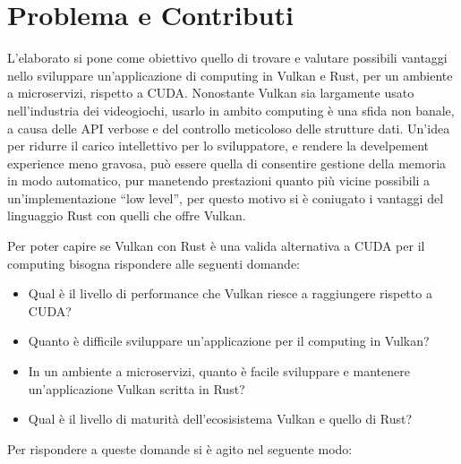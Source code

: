 \section[Problema e Contributi]{Problema e Contributi}


L'elaborato si pone come obiettivo quello di trovare e valutare possibili vantaggi nello sviluppare un'applicazione di computing in Vulkan e Rust, per un ambiente a microservizi, rispetto a CUDA.
Nonostante Vulkan sia largamente usato nell'industria dei videogiochi, usarlo in ambito computing è una sfida non banale, a causa delle API verbose e del controllo meticoloso delle strutture dati. 
Un'idea per ridurre il carico intellettivo per lo sviluppatore, e rendere la develpement experience meno gravosa, può essere quella di consentire gestione della memoria in modo automatico, pur manetendo prestazioni quanto più vicine possibili a un'implementazione ``low level'', per questo motivo si è coniugato i vantaggi del linguaggio Rust con quelli che offre Vulkan. 

Per poter capire se Vulkan con Rust è una valida alternativa a CUDA per il computing bisogna rispondere alle seguenti domande:

\begin{itemize}
    \item Qual è il livello di performance che Vulkan riesce a raggiungere rispetto a CUDA? 
    \item Quanto è difficile sviluppare un'applicazione per il computing in Vulkan?
    \item In un ambiente a microservizi, quanto è facile sviluppare e mantenere un'applicazione Vulkan scritta in Rust? 
    \item Qual è il livello di maturità dell'ecosisistema Vulkan e quello di Rust?
\end{itemize}

Per rispondere a queste domande si è agito nel seguente modo:

